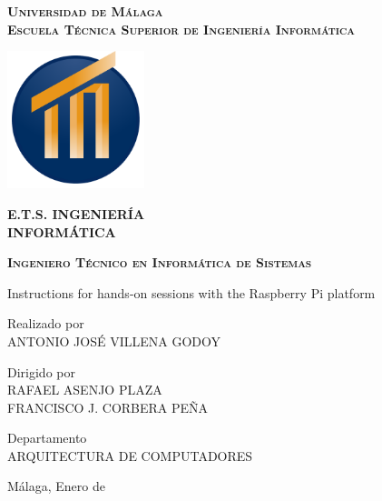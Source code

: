 \documentclass[12pt,a4paper]{book} %
\begin{document}
\begin{titlepage}
  \begin{center}
    \large
    \scshape
    \bfseries
    Universidad de Málaga \\
    Escuela Técnica Superior de Ingeniería Informática
  \end{center}

  \smallskip

  \begin{center}
    \includegraphics[width=4cm,keepaspectratio]{graphs/EscudoETSIIcolor.pdf}

    \bfseries
    \color[rgb]{0,0.18,0.39}
    \fontsize{15}{15}
    \selectfont E.T.S. INGENIERÍA\\
    \fontsize{20}{20}
    \selectfont INFORMÁTICA
  \end{center}

  \begin{center}
    \scshape
    \large
    \bfseries
    Ingeniero Técnico en Informática de Sistemas
  \end{center}

  \smallskip

  \begin{center}
    \huge
    \sffamily
    \bfseries
    \pfctitlename
  \end{center}

  \begin{center}
    \huge
    \sffamily
    Instructions for hands-on sessions with the Raspberry Pi platform
  \end{center}

  \bigskip

  \begin{center}
    \huge
    \sffamily
    Realizado por\\
    ANTONIO JOSÉ VILLENA GODOY
  \end{center}

  \begin{center}
    \huge
    \sffamily
    Dirigido por\\
    RAFAEL ASENJO PLAZA\\
    FRANCISCO J. CORBERA PEÑA
  \end{center}

  \begin{center}
    \huge
    \sffamily
    Departamento\\
    ARQUITECTURA DE COMPUTADORES
  \end{center}

  \vfill

  \hfill \large Málaga, Enero de \pfcanno
\end{titlepage}
\end{document}

